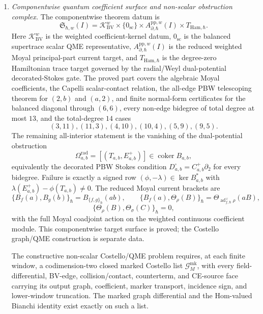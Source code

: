 \begin{enumerate}
  \item \emph{Componentwise quantum coefficient surface and non-scalar
  obstruction complex.}
  The componentwise theorem datum is
  \[
    \mathfrak S_{\hbar,w}(I)
      =
      \mathcal K_{\mathrm{BV}}^w
      \times\{0_{\mathrm{sc}}\}
      \times A^{\mathrm{pp},w}_{\partial,\hbar}(I)
      \times T_{\mathrm{Ham},\hbar}.
  \]
  Here \(\mathcal K_{\mathrm{BV}}^w\) is the weighted
  coefficient-kernel datum, \(0_{\mathrm{sc}}\) is the balanced
  supertrace scalar QME representative, \(A^{\mathrm{pp},w}_{\partial,\hbar}(I)\)
  is the reduced weighted Moyal principal-part current target, and
  \(T_{\mathrm{Ham},\hbar}\) is the degree-zero Hamiltonian trace target
  governed by the radial/Weyl dual-potential decorated-Stokes gate.
  The proved part covers the algebraic Moyal coefficients, the Capelli
  scalar-contact relation, the all-edge PBW telescoping theorem for
  \((2,b)\) and \((a,2)\), and finite normal-form certificates for the
  balanced diagonal through \((6,6)\), every non-edge bidegree of total
  degree at most \(13\), and the total-degree \(14\) cases
  \[
    (3,11),(11,3),(4,10),(10,4),(5,9),(9,5).
  \]
  The remaining all-interior statement is the vanishing of the
  dual-potential obstruction
  \[
    \Omega^{\mathrm{rad}}_{a,b}
    =
    [(T_{a,b},E^+_{a,b})]\in\operatorname{coker}B_{a,b},
  \]
  equivalently the decorated PBW Stokes condition
  \(D^\square_{a,b}=C^+_{a,b}\partial_2\) for every bidegree.  Failure is
  exactly a signed row \((\phi,-\lambda)\in\ker B_{a,b}^*\) with
  \(\lambda(E^+_{a,b})-\phi(T_{a,b})\ne0\).
  The reduced Moyal current brackets are
  \[
    \{B_f(a),B_g(b)\}_\hbar
      =B_{\{f,g\}_\hbar}(ab),\qquad
    \{B_f(a),\Theta_\rho(B)\}_\hbar
      =
      \Theta_{\operatorname{ad}^{\vee}_{f,\hbar}\rho}(aB),
  \]
  \[
    \{\Theta_\rho(B),\Theta_\sigma(C)\}_\hbar=0,
  \]
  with the full Moyal coadjoint action on the weighted continuous
  coefficient module.  This componentwise target surface is proved;
  the Costello graph/QME construction is separate data.

  The constructive non-scalar Costello/QME problem requires, at each
  finite window, a codimension-two closed marked Costello list
  \(\mathcal G_M^{\mathrm{mk}}\), with every field-differential,
  BV-edge, collision/contact, counterterm, and CE-source face carrying
  its output graph, coefficient, marker transport, incidence sign, and
  lower-window truncation.  The marked graph differential and the
  Hom-valued Bianchi identity exist exactly on such a list.


\end{enumerate}
